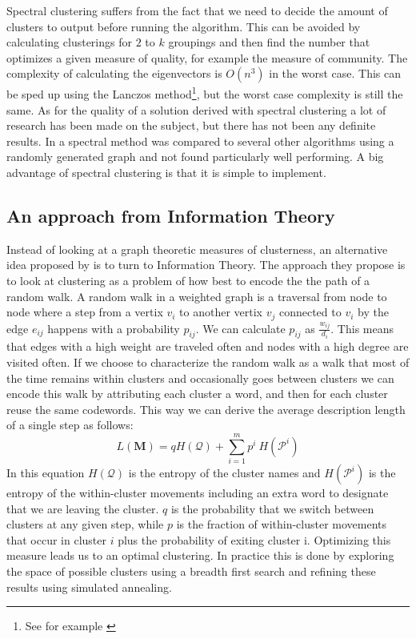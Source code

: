 Spectral clustering suffers from the fact that we need to decide the 
amount of clusters to output before running the algorithm. This can be 
avoided by calculating clusterings for $2$ to $k$ groupings and then 
find the number that optimizes a given measure of quality, for example 
the measure of community. The complexity of calculating the eigenvectors 
is $O(n^3)$ in the worst case. This can be sped up using the Lanczos 
method\footnote{See for example \cite{golub1996}}, but the worst case 
complexity is still the same. As for the quality of a solution derived 
with spectral clustering a lot of research has been made on the subject, 
but there has not been any definite results. In \cite{lancichinetti2009} 
a spectral method was compared to several other algorithms using a 
randomly generated graph and not found particularly well performing.  A 
big advantage of spectral clustering is that it is simple to implement.

\subsection{An approach from Information Theory}
Instead of looking at a graph theoretic measures of clusterness, an 
alternative idea proposed by \cite{rosvall2008} is to turn to 
Information Theory. The approach they propose is to look at clustering 
as a problem of how best to encode the the path of a random walk. A 
random walk in a weighted graph is a traversal from node to node where a 
step from a vertix $v_i$ to another vertix $v_j$ connected to $v_i$ by 
the edge $e_{ij}$ happens with a probability $p_{ij}$. We can calculate 
$p_{ij}$ as $\frac{w_{ij}}{d_i}$. This means that edges with a high 
weight are traveled often and nodes with a high degree are visited 
often. If we choose to characterize the random walk as a walk that most 
of the time remains within clusters and occasionally goes between 
clusters we can encode this walk by attributing each cluster a word, and 
then for each cluster reuse the same codewords. This way we can derive 
the average description length of a single step as follows:
\begin{equation}
	L(\textbf{M}) = q H(\mathcal{Q}) + \sum_{i=1}^{m} p^i \
	H(\mathcal{P}^i)
\end{equation}
In this equation $H(\mathcal{Q})$ is the entropy of the cluster names 
and $H(\mathcal{P}^i)$ is the entropy of the within-cluster movements 
including an extra word to designate that we are leaving the cluster.  
$q$ is the probability that we switch between clusters at any given 
step, while $p$ is the fraction of within-cluster movements that occur 
in cluster $i$ plus the probability of exiting cluster i. Optimizing 
this measure leads us to an optimal clustering. In practice this is done 
by exploring the space of possible clusters using a breadth first search 
and refining these results using simulated annealing.

